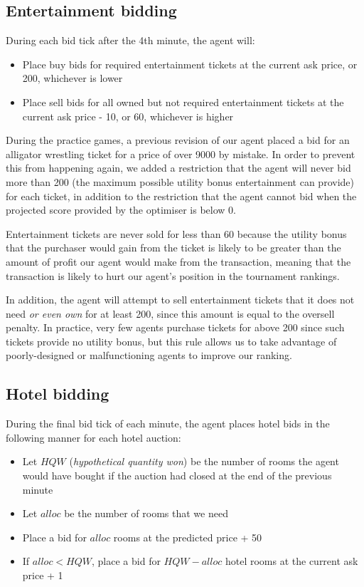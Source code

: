 \documentclass[a4paper]{proc}
\begin{document}
\subsection{Entertainment bidding}

During each bid tick after the 4th minute, the agent will:

\begin{itemize}
  \item Place buy bids for required entertainment tickets at the current ask price, or 200, whichever is lower
  \item Place sell bids for all owned but not required entertainment tickets at the current ask price - 10, or 60, whichever is higher
\end{itemize}

During the practice games, a previous revision of our agent placed a bid for an alligator wrestling ticket for a price of over 9000 by mistake. In order to prevent this from happening again, we added a restriction that the agent will never bid more than 200 (the maximum possible utility bonus entertainment can provide) for each ticket, in addition to the restriction that the agent cannot bid when the projected score provided by the optimiser is below 0.

Entertainment tickets are never sold for less than 60 because the utility bonus that the purchaser would gain from the ticket is likely to be greater than the amount of profit our agent would make from the transaction, meaning that the transaction is likely to hurt our agent's position in the tournament rankings.

In addition, the agent will attempt to sell entertainment tickets that it does not need \emph{or even own} for at least 200, since this amount is equal to the oversell penalty. In practice, very few agents purchase tickets for above 200 since such tickets provide no utility bonus, but this rule allows us to take advantage of poorly-designed or malfunctioning agents to improve our ranking.

\subsection{Hotel bidding}

During the final bid tick of each minute, the agent places hotel bids in the following manner for each hotel auction:

\begin{itemize}
  \item Let $HQW$ (\emph{hypothetical quantity won}) be the number of rooms the agent would have bought if the auction had closed at the end of the previous minute
  \item Let $alloc$ be the number of rooms that we need
  \item Place a bid for $alloc$ rooms at the predicted price + 50
  \item If $alloc < HQW$, place a bid for $HQW - alloc$ hotel rooms at the current ask price + 1
\end{itemize}
\end{document}
